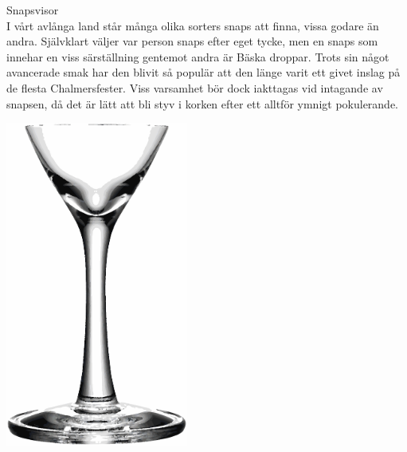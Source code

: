 \begin{flushleft}
{\Huge Snapsvisor\\}
\vspace{1 cm}
{\Large
I vårt avlånga land står många olika sorters snaps att finna, vissa godare
än andra. Självklart väljer var person snaps efter eget tycke, men en snaps som innehar en viss särställning gentemot andra är
Bäska droppar. Trots sin något avancerade smak har den blivit så populär
att den länge varit ett givet inslag på de flesta Chalmersfester. Viss varsamhet bör
dock iakttagas vid intagande av snapsen, då det är lätt att bli styv i
korken efter ett alltför ymnigt pokulerande. 
}
\end{flushleft}

\vspace{2cm}
\begin{center}
\includegraphics[width=6cm]{bilder/snaps.eps}
\end{center}

